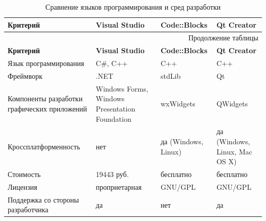\small
\singlespacing
\begin{longtable}[h]{|p{}|p{}|p{}|p{}|}
  \caption{Сравнение языков программирования и сред разработки}
	\\ \hline
	  \textbf{Критерий}                                              &
	  \textbf{Visual Studio}                                         &
	  \textbf{Code::Blocks}                                          &
	  \textbf{Qt Creator}
	\\ \hline
  \endfirsthead

  \multicolumn{4}{r}{\normalsize Продолжение таблицы \thetable{} \small}
  \\ \hline
    \textbf{Критерий}                                              &
	  \textbf{Visual Studio}                                         &
	  \textbf{Code::Blocks}                                          &
	  \textbf{Qt Creator}
    \\ \hline
  \endhead

  Язык программирования &
  C\#, C++              &
  C++                   &
  C++
  \\ \hline

  Фреймворк &
  .NET      &
  stdLib    &
  Qt
  \\ \hline

  Компоненты разработки графических приложений   &
  Windows Forms, Windows Presentation Foundation &
  wxWidgets                                      &
  QWidgets
  \\ \hline

  Кроссплатформенность &
  нет                  &
  да (Windows, Linux)  &
  да (Windows, Linux, Mac OS X)
  \\ \hline

  Стоимость  &
  19443 руб. &
  бесплатно  &
  бесплатно
  \\ \hline

  Лицензия      &
  проприетарная &
  GNU/GPL       &
  GNU/GPL
  \\ \hline

  Поддержка со стороны разработчика &
  да                                &
  нет                               &
  да
  \\ \hline

\end{longtable}
\normalsize
\onehalfspacing

